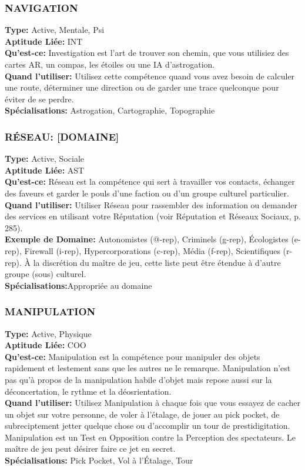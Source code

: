 \subsubsection{NAVIGATION} \textbf{Type:} Active, Mentale, Psi \\ \textbf{Aptitude Liée:} INT \\ \textbf{Qu'est-ce:} Investigation est l'art de trouver son chemin, que vous utilisiez des cartes AR, un compas, les étoiles ou une IA d'astrogation. \\ \textbf{Quand l'utiliser:} Utilisez cette compétence quand vous avez besoin de calculer une route, déterminer une direction ou de garder une trace quelconque pour éviter de se perdre. \\ \textbf{Spécialisations:} Astrogation, Cartographie, Topographie 

\subsubsection{RÉSEAU: [DOMAINE]} \textbf{Type:} Active, Sociale \\ \textbf{Aptitude Liée:} AST \\ \textbf{Qu'est-ce:} Réseau est la compétence qui sert à travailler vos contacts, échanger des faveurs et garder le pouls d'une faction ou d'un groupe culturel particulier. \\ \textbf{Quand l'utiliser:} Utiliser Réseau pour rassembler des information ou demander des services en utilisant votre Réputation (voir Réputation et Réseaux Sociaux, p. 285). \\ \textbf{Exemple de Domaine:} Autonomistes (@-rep), Criminels (g-rep), Écologistes (e-rep), Firewall (i-rep), Hypercorporations (c-rep), Média (f-rep), Scientifiques (r-rep). À la discrétion du maître de jeu, cette liste peut être étendue à d'autre groupe (sous) culturel. \\ \textbf{Spécialisations:}Appropriée au domaine 

\subsubsection{MANIPULATION} \textbf{Type:} Active, Physique\\ \textbf{Aptitude Liée:} COO \\ \textbf{Qu'est-ce:} Manipulation est la compétence pour manipuler des objets rapidement et lestement sans que les autres ne le remarque. Manipulation n'est pas qu'à propos de la manipulation habile d'objet mais repose aussi sur la déconcertation, le rythme et la déosrientation. \\ \textbf{Quand l'utiliser:} Utilisez Manipulation à chaque fois que vous essayez de cacher un objet sur votre personne, de voler à l'étalage, de jouer au pick pocket, de subreciptement jetter quelque chose ou d'accomplir un tour de prestidigitation. Manipulation est un Test en Opposition contre la Perception des spectateurs. Le maître de jeu peut désirer faire ce jet en secret. \\ \textbf{Spécialisations:} Pick Pocket, Vol à l'Étalage, Tour 

